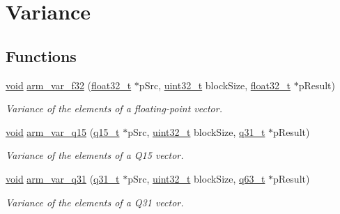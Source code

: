\hypertarget{group__variance}{\section{Variance}
\label{group__variance}
}
\subsection*{Functions}
\begin{DoxyCompactItemize}
\item 
\hyperlink{group___n_a_m_e_ga18028b8badbf1ea7e704ccac3c488e82}{void} \hyperlink{group__variance_ga393f26c5a3bfa05624fb8d32232a6d96}{arm\-\_\-var\-\_\-f32} (\hyperlink{arm__math_8h_a4611b605e45ab401f02cab15c5e38715}{float32\-\_\-t} $\ast$p\-Src, \hyperlink{stdint_8h_a435d1572bf3f880d55459d9805097f62}{uint32\-\_\-t} block\-Size, \hyperlink{arm__math_8h_a4611b605e45ab401f02cab15c5e38715}{float32\-\_\-t} $\ast$p\-Result)
\begin{DoxyCompactList}\small\item\em Variance of the elements of a floating-\/point vector. \end{DoxyCompactList}\item 
\hyperlink{group___n_a_m_e_ga18028b8badbf1ea7e704ccac3c488e82}{void} \hyperlink{group__variance_ga957b23ddcc2e0883461797ebf8a2cf1f}{arm\-\_\-var\-\_\-q15} (\hyperlink{arm__math_8h_ab5a8fb21a5b3b983d5f54f31614052ea}{q15\-\_\-t} $\ast$p\-Src, \hyperlink{stdint_8h_a435d1572bf3f880d55459d9805097f62}{uint32\-\_\-t} block\-Size, \hyperlink{arm__math_8h_adc89a3547f5324b7b3b95adec3806bc0}{q31\-\_\-t} $\ast$p\-Result)
\begin{DoxyCompactList}\small\item\em Variance of the elements of a Q15 vector. \end{DoxyCompactList}\item 
\hyperlink{group___n_a_m_e_ga18028b8badbf1ea7e704ccac3c488e82}{void} \hyperlink{group__variance_ga353e4c924e707ab9ee7687d28094a668}{arm\-\_\-var\-\_\-q31} (\hyperlink{arm__math_8h_adc89a3547f5324b7b3b95adec3806bc0}{q31\-\_\-t} $\ast$p\-Src, \hyperlink{stdint_8h_a435d1572bf3f880d55459d9805097f62}{uint32\-\_\-t} block\-Size, \hyperlink{arm__math_8h_a5aea1cb12fc02d9d44c8abf217eaa5c6}{q63\-\_\-t} $\ast$p\-Result)
\begin{DoxyCompactList}\small\item\em Variance of the elements of a Q31 vector. \end{DoxyCompactList}\end{DoxyCompactItemize}


